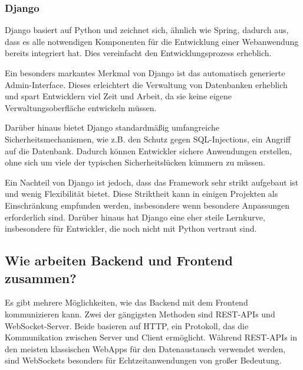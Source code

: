 \documentclass[biblatex]{lni}
\begin{document}
\subsubsection{Django}

Django basiert auf Python und zeichnet sich, ähnlich wie Spring, dadurch aus,
dass es alle notwendigen Komponenten für die Entwicklung einer Webanwendung bereits integriert hat.
Dies vereinfacht den Entwicklungsprozess erheblich. \cite{MED}

Ein besonders markantes Merkmal von Django ist das automatisch generierte Admin-Interface.
Dieses erleichtert die Verwaltung von Datenbanken erheblich und spart Entwicklern viel Zeit und Arbeit,
da sie keine eigene Verwaltungsoberfläche entwickeln müssen. \cite{DJO}

Darüber hinaus bietet Django standardmäßig umfangreiche Sicherheitsmechanismen,
wie z.B. den Schutz gegen \ac{SQL}-Injections, ein Angriff auf die Datenbank.
Dadurch können Entwickler sichere Anwendungen erstellen,
ohne sich um viele der typischen Sicherheitslücken kümmern zu müssen.

Ein Nachteil von Django ist jedoch,
dass das Framework sehr strikt aufgebaut ist und wenig Flexibilität bietet. \cite{MED}
Diese Striktheit kann in einigen Projekten als Einschränkung empfunden werden,
insbesondere wenn besondere Anpassungen erforderlich sind.
Darüber hinaus hat Django eine eher steile Lernkurve, insbesondere für Entwickler, die noch nicht mit Python vertraut sind.

\subsection{Wie arbeiten Backend und Frontend zusammen?}

Es gibt mehrere Möglichkeiten, wie das Backend mit dem Frontend kommunizieren kann.
Zwei der gängigsten Methoden sind \ac{REST}-\ac{API}s und WebSocket-Server.
Beide basieren auf \ac{HTTP}, ein Protokoll, das die Kommunikation zwischen Server und Client ermöglicht.
Während \ac{REST}-\ac{API}s in den meisten klassischen \ac{WebApp}s für den Datenaustausch verwendet werden,
sind WebSockets besonders für Echtzeitanwendungen von großer Bedeutung. \cite{ReSock}
\end{document}
